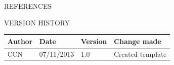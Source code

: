 \documentclass{article}
\begin{document}
	\newpage
	
	\nocite{LaTeXTemplate}

	\newpage
	\begin{section}{REFERENCES}
		
		
	\end{section}
	
	\vspace{1cm}
	\begin{section}{VERSION HISTORY}
		\begin{tabularx}{\linewidth}{| p{2cm} | p{2cm} | p{2cm} | X | }
			\hline
			\bf{Author} & \bf{Date} & \bf{Version} & \bf{Change made} \\
			\hline
			CCN & 07/11/2013 & 1.0 & Created template \\
			\hline
		\end{tabularx}
	\end{section}
\end{document}
